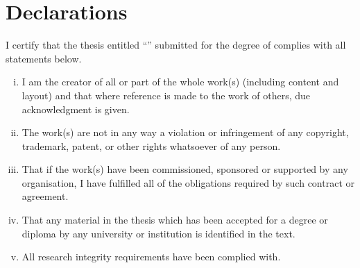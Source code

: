 \newpage
\chapter*{Declarations}

I certify that the thesis entitled ``\thetitle{}'' submitted for the degree of \thedegree{} complies with all statements below.

\begin{enumerate}[i)]
  \item I am the creator of all or part of the whole work(s) (including content and layout) and that where reference is made to the work of others, due acknowledgment is given.    
  \item The work(s) are not in any way a violation or infringement of any copyright, trademark, patent, or other rights whatsoever of any person.
  \item That if the work(s) have been commissioned, sponsored or supported by any organisation, I have fulfilled all of the obligations required by such contract or agreement.
  \item That any material in the thesis which has been accepted for a degree or diploma by any university or institution is identified in the text.
  \item All research integrity requirements have been complied with.
\end{enumerate}

\vspace{2cm}

\noindent
\hspace{\fill}
\parbox[b]{0.4\linewidth}{
  \hrulefill\\
  \raggedleft
  \theauthor{}\\
  \footnotesize
  \theauthorspostnominals{}\\
  \thedate{}
}